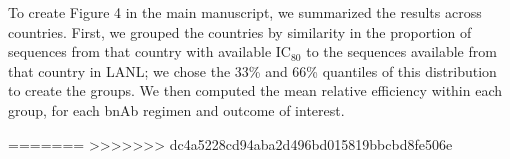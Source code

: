 \documentclass[10pt]{article}
\begin{document}
To create Figure 4 in the main manuscript, we summarized the results across countries. First, we grouped the countries by similarity in the proportion of sequences from that country with available IC$_{80}$ to the sequences available from that country in LANL; we chose the 33\% and 66\% quantiles of this distribution to create the groups. We then computed the mean relative efficiency within each group, for each bnAb regimen and outcome of interest.


=======
>>>>>>> dc4a5228cd94aba2d496bd015819bbcbd8fe506e
\end{document}
